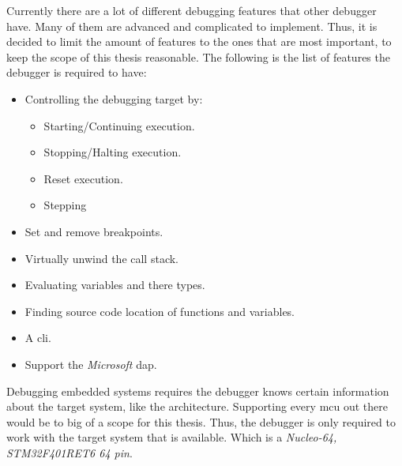 

Currently there are a lot of different debugging features that other debugger have.
Many of them are advanced and complicated to implement.
Thus, it is decided to limit the amount of features to the ones that are most important, to keep the scope of this thesis reasonable.
The following is the list of features the debugger is required to have:

\begin{itemize} \label{list:debuggerfeatures}
  \item Controlling the debugging target by:
  \begin{itemize}
    \item Starting/Continuing execution.
    \item Stopping/Halting execution.
    \item Reset execution.
    \item Stepping
  \end{itemize}
  \item Set and remove breakpoints.
  \item Virtually unwind the call stack.
  \item Evaluating variables and there types.
  \item Finding source code location of functions and variables.
  \item A \acrfull{cli}.
  \item Support the \emph{Microsoft} \acrfull{dap}.
\end{itemize}


Debugging embedded systems requires the debugger knows certain information about the target system, like the architecture.
Supporting every \gls{mcu} out there would be to big of a scope for this thesis.
Thus, the debugger is only required to work with the target system that is available.
Which is a \emph{Nucleo-64, STM32F401RET6 64 pin}.

%


